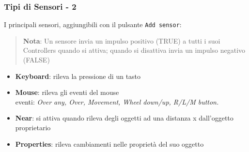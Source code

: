 \documentclass{beamer}
\def\code#1{\texttt{#1}}
\begin{document}
		\begin{frame}
			\frametitle{Tipi di Sensori - 2}
			I principali sensori, aggiungibili con il pulsante \code{Add sensor}:
			\begin{quote}
			\textcolor{BlenderOrange}{\textbf{Nota}: Un sensore invia un impulso positivo (TRUE) a tutti i suoi Controllers quando si attiva; quando si disattiva invia un impulso negativo (FALSE)}
			\end{quote}
			\begin{itemize}
				\item \textbf{Keyboard}: rileva la pressione di un tasto %
				\item \textbf{Mouse}: rileva gli eventi del mouse \\ {\footnotesize\hspace{1em}eventi: \textit{Over any, Over, Movement, Wheel down/up, R/L/M button.}}
				\item \textbf{Near}: si attiva quando rileva degli oggetti ad una distanza x dall'oggetto proprietario
				\item \textbf{Properties}: rileva cambiamenti nelle proprietà del suo oggetto
			\end{itemize}
		\end{frame}	
		
\end{document}
